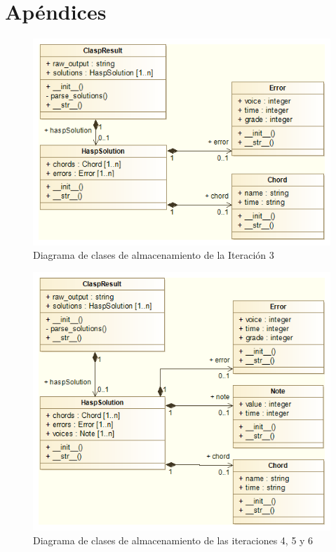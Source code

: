 \newpage
\chapter*{Apéndices}
\begin{figure}[th]
	\centering
	\includegraphics[width=0.8\linewidth]{imagenes/class_diagram_2.png}
	\caption{Diagrama de clases de almacenamiento de la Iteración 3}
	\label{fig:class_diagram_2}
\end{figure}
\newpage
\begin{figure}[th]
	\centering
	\includegraphics[width=0.8\linewidth]{imagenes/class_diagram_note.png}
	\caption{Diagrama de clases de almacenamiento de las iteraciones 4, 5 y 6}
	\label{fig:class_diagram_note}
\end{figure}
\newpage
\thispagestyle{empty}
